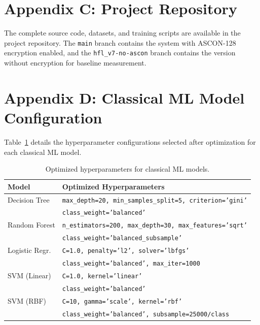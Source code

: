 \begin{appendix}
\section{Appendix C: Project Repository}
\label{anx:repositorio}

The complete source code, datasets, and training scripts are available in the project repository. The \texttt{main} branch contains the system with ASCON-128 encryption enabled, and the \texttt{hfl\_v7-no-ascon} branch contains the version without encryption for baseline measurement.

\section{Appendix D: Classical ML Model Configuration}
\label{anx:ml_classic}

Table~\ref{tab:ml_config} details the hyperparameter configurations selected after optimization for each classical ML model.

\begin{table}[H]
\centering
\caption{Optimized hyperparameters for classical ML models.}
\small
\begin{tabular}{l l}
\toprule
\textbf{Model} & \textbf{Optimized Hyperparameters} \\
\midrule
Decision Tree & \texttt{max\_depth=20, min\_samples\_split=5, criterion='gini'} \\
              & \texttt{class\_weight='balanced'} \\
\addlinespace
Random Forest & \texttt{n\_estimators=200, max\_depth=30, max\_features='sqrt'} \\
              & \texttt{class\_weight='balanced\_subsample'} \\
\addlinespace
Logistic Regr. & \texttt{C=1.0, penalty='l2', solver='lbfgs'} \\
               & \texttt{class\_weight='balanced', max\_iter=1000} \\
\addlinespace
SVM (Linear)  & \texttt{C=1.0, kernel='linear'} \\
              & \texttt{class\_weight='balanced'} \\
\addlinespace
SVM (RBF)     & \texttt{C=10, gamma='scale', kernel='rbf'} \\
              & \texttt{class\_weight='balanced', subsample=25000/class} \\
\bottomrule
\end{tabular}
\label{tab:ml_config}
\end{table}


\end{appendix}

